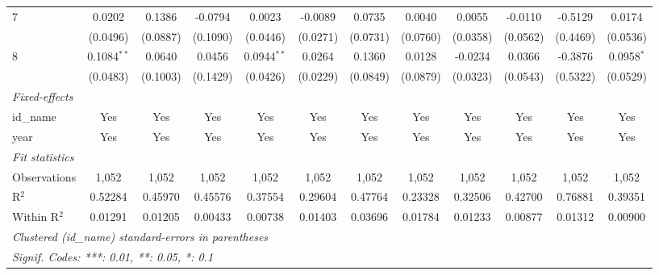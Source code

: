 \begin{adjustbox}{width=650}
\begin{tabular}{lccccccccccc}
    7     & 0.0202          & 0.1386               & -0.0794                    & 0.0023        & -0.0089                       & 0.0735                      & 0.0040                & 0.0055           & -0.0110        & -0.5129   & 0.0174\\   
                                            & (0.0496)        & (0.0887)             & (0.1090)                   & (0.0446)      & (0.0271)                      & (0.0731)                    & (0.0760)              & (0.0358)         & (0.0562)       & (0.4469)  & (0.0536)\\   
    8     & 0.1084$^{**}$   & 0.0640               & 0.0456                     & 0.0944$^{**}$ & 0.0264                        & 0.1360                      & 0.0128                & -0.0234          & 0.0366         & -0.3876   & 0.0958$^{*}$\\   
                                            & (0.0483)        & (0.1003)             & (0.1429)                   & (0.0426)      & (0.0229)                      & (0.0849)                    & (0.0879)              & (0.0323)         & (0.0543)       & (0.5322)  & (0.0529)\\   
   \midrule
   \emph{Fixed-effects}\\
   id\_name                                 & Yes             & Yes                  & Yes                        & Yes           & Yes                           & Yes                         & Yes                   & Yes              & Yes            & Yes       & Yes\\  
   year                                     & Yes             & Yes                  & Yes                        & Yes           & Yes                           & Yes                         & Yes                   & Yes              & Yes            & Yes       & Yes\\  
   \midrule
   \emph{Fit statistics}\\
   Observations                             & 1,052           & 1,052                & 1,052                      & 1,052         & 1,052                         & 1,052                       & 1,052                 & 1,052            & 1,052          & 1,052     & 1,052\\  
   R$^2$                                    & 0.52284         & 0.45970              & 0.45576                    & 0.37554       & 0.29604                       & 0.47764                     & 0.23328               & 0.32506          & 0.42700        & 0.76881   & 0.39351\\  
   Within R$^2$                             & 0.01291         & 0.01205              & 0.00433                    & 0.00738       & 0.01403                       & 0.03696                     & 0.01784               & 0.01233          & 0.00877        & 0.01312   & 0.00900\\  
   \midrule \midrule
   \multicolumn{12}{l}{\emph{Clustered (id\_name) standard-errors in parentheses}}\\
   \multicolumn{12}{l}{\emph{Signif. Codes: ***: 0.01, **: 0.05, *: 0.1}}\\
\end{tabular}
\end{adjustbox}
\par\endgroup
